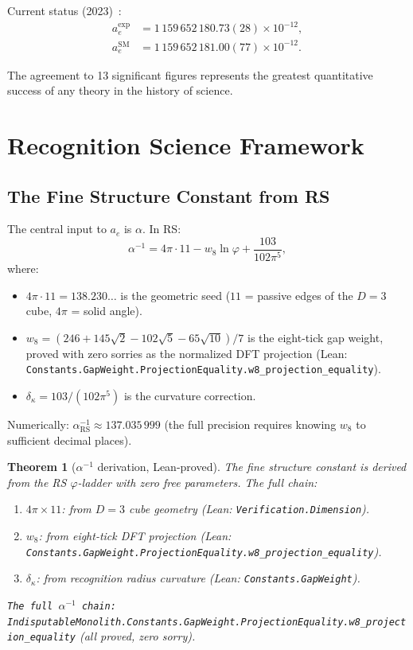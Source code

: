 \documentclass[12pt,a4paper]{article}
\newtheorem{theorem}{Theorem}[section]
\theoremstyle{definition}
\theoremstyle{remark}
\begin{document}
Current status (2023)~\cite{Fan2023,Morel2020}:
\begin{align}
  a_e^\mathrm{exp} &= 1\,159\,652\,180.73(28) \times 10^{-12}, \\
  a_e^\mathrm{SM} &= 1\,159\,652\,181.00(77) \times 10^{-12}.
\end{align}

The agreement to 13 significant figures represents the greatest
quantitative success of any theory in the history of science.

\section{Recognition Science Framework}
\label{sec:rs}

\subsection{The Fine Structure Constant from RS}

The central input to $a_e$ is $\alpha$.  In RS:
\begin{equation}
  \alpha^{-1} = 4\pi \cdot 11 - w_8 \ln\varphi
  + \frac{103}{102\pi^5},
  \label{eq:alpha_rs}
\end{equation}
where:
\begin{itemize}
  \item $4\pi \cdot 11 = 138.230\ldots$ is the geometric seed
        ($11$ = passive edges of the $D=3$ cube, $4\pi$ = solid angle).
  \item $w_8 = (246 + 145\sqrt{2} - 102\sqrt{5} - 65\sqrt{10})/7$
        is the eight-tick gap weight, proved with zero sorries as
        the normalized DFT projection
        (Lean: \texttt{Constants.GapWeight.ProjectionEquality.w8\_projection\_equality}).
  \item $\delta_\kappa = 103/(102\pi^5)$ is the curvature correction.
\end{itemize}

Numerically: $\alpha^{-1}_\mathrm{RS} \approx 137.035\,999$ (the
full precision requires knowing $w_8$ to sufficient decimal places).

\begin{theorem}[$\alpha^{-1}$ derivation, Lean-proved]\label{thm:alpha}
The fine structure constant is derived from the RS $\varphi$-ladder
with zero free parameters.  The full chain:
\begin{enumerate}
  \item $4\pi \times 11$: from $D = 3$ cube geometry
        (Lean: \texttt{Verification.Dimension}).
  \item $w_8$: from eight-tick DFT projection
        (Lean: \texttt{Constants.GapWeight.ProjectionEquality.w8\_projection\_equality}).
  \item $\delta_\kappa$: from recognition radius curvature
        (Lean: \texttt{Constants.GapWeight}).
\end{enumerate}
\texttt{The full $\alpha^{-1}$ chain: IndisputableMonolith.Constants.GapWeight.ProjectionEquality.w8\_projection\_equality}
(all proved, zero sorry).
\end{theorem}
\end{document}
